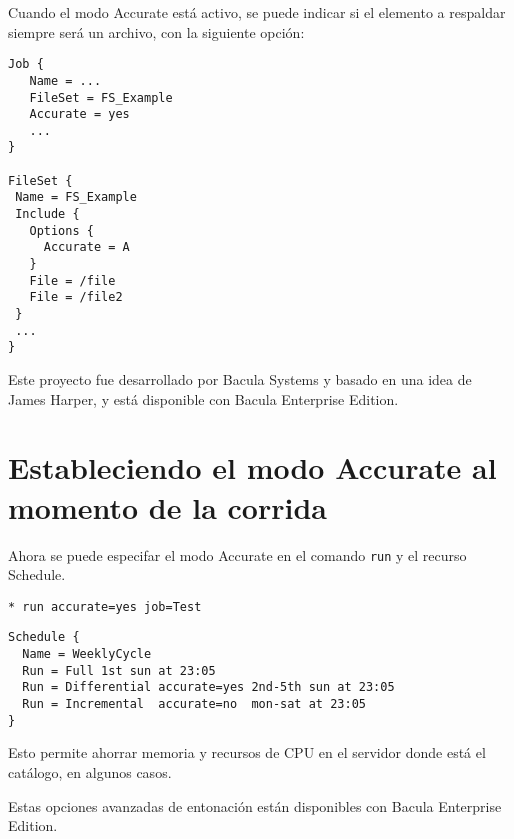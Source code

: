 Cuando el modo Accurate está activo, se puede indicar si el elemento a respaldar 
siempre será un archivo, con la siguiente opción:

\begin{verbatim}
Job {
   Name = ...
   FileSet = FS_Example
   Accurate = yes
   ...
}

FileSet {
 Name = FS_Example
 Include {
   Options {
     Accurate = A
   }
   File = /file
   File = /file2
 }
 ...
}
\end{verbatim}

Este proyecto fue desarrollado por Bacula Systems y basado en una idea de James Harper, 
y está disponible con Bacula Enterprise Edition.

\section{Estableciendo el modo Accurate al momento de la corrida}

Ahora se puede especifar el modo Accurate en el comando \texttt{run} y el recurso Schedule.

\begin{verbatim}
* run accurate=yes job=Test
\end{verbatim}

\begin{verbatim}
Schedule {
  Name = WeeklyCycle
  Run = Full 1st sun at 23:05
  Run = Differential accurate=yes 2nd-5th sun at 23:05
  Run = Incremental  accurate=no  mon-sat at 23:05
}
\end{verbatim}

Esto permite ahorrar memoria y recursos de CPU en el servidor donde está el catálogo, 
en algunos casos.

Estas opciones avanzadas de entonación están disponibles con Bacula Enterprise Edition.
